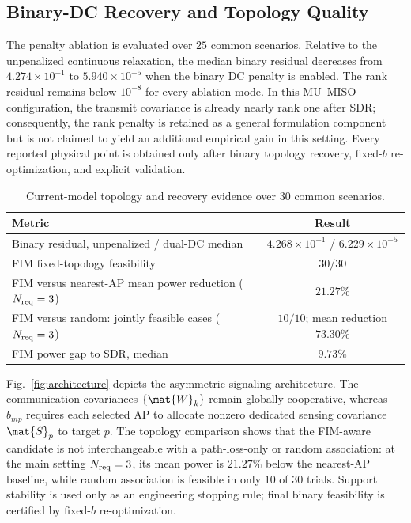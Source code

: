 \subsection{Binary-DC Recovery and Topology Quality}
The penalty ablation is evaluated over $25$ common scenarios. Relative to the
unpenalized continuous relaxation, the median binary residual decreases from
$4.274\times10^{-1}$ to $5.940\times10^{-5}$ when the binary DC penalty is
enabled. The rank residual remains below $10^{-8}$ for every ablation mode.
In this MU--MISO configuration, the transmit covariance is already nearly
rank one after SDR; consequently, the rank penalty is retained as a general
formulation component but is not claimed to yield an additional empirical
gain in this setting. Every reported physical point is obtained only after
binary topology recovery, fixed-$b$ re-optimization, and explicit validation.

\begin{table}[htbp]
\centering
\caption{Current-model topology and recovery evidence over $30$ common scenarios.}
\label{tab:main-mc}
\begin{tabular}{lc}
\toprule
Metric & Result\\
\midrule
Binary residual, unpenalized / dual-DC median & $4.268\times10^{-1}$ / $6.229\times10^{-5}$\\
FIM fixed-topology feasibility & $30/30$\\
FIM versus nearest-AP mean power reduction ($N_{\rm req}=3$) & $21.27\%$\\
FIM versus random: jointly feasible cases ($N_{\rm req}=3$) & $10/10$; mean reduction $73.30\%$\\
FIM power gap to SDR, median & $9.73\%$\\
\bottomrule
\end{tabular}
\end{table}

Fig.~\ref{fig:architecture} depicts the asymmetric signaling architecture.
The communication covariances $\{\mat{W}_k\}$ remain globally cooperative,
whereas $b_{mp}$ requires each selected AP to allocate nonzero dedicated
sensing covariance $\mat{S}_p$ to target $p$. The topology comparison shows
that the FIM-aware candidate is not interchangeable with a path-loss-only or
random association: at the main setting $N_{\rm req}=3$, its mean power is
$21.27\%$ below the nearest-AP baseline, while random association is feasible
in only $10$ of $30$ trials. Support
stability is used only as an engineering stopping rule; final binary
feasibility is certified by fixed-$b$ re-optimization.

